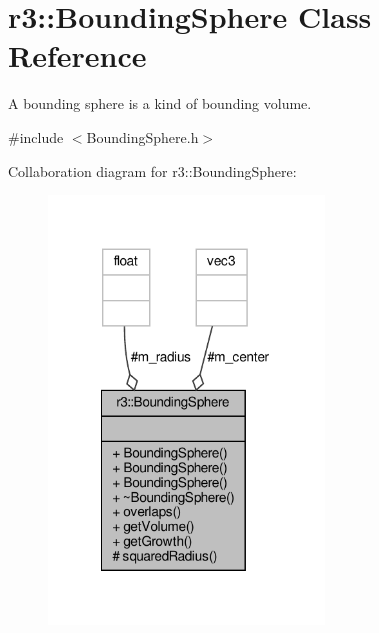 \hypertarget{classr3_1_1_bounding_sphere}{}\section{r3\+:\+:Bounding\+Sphere Class Reference}
\label{classr3_1_1_bounding_sphere}


A bounding sphere is a kind of bounding volume.  




{\ttfamily \#include $<$Bounding\+Sphere.\+h$>$}



Collaboration diagram for r3\+:\+:Bounding\+Sphere\+:\nopagebreak
\begin{figure}[H]
\begin{center}
\leavevmode
\includegraphics[width=208pt]{classr3_1_1_bounding_sphere__coll__graph}
\end{center}
\end{figure}
